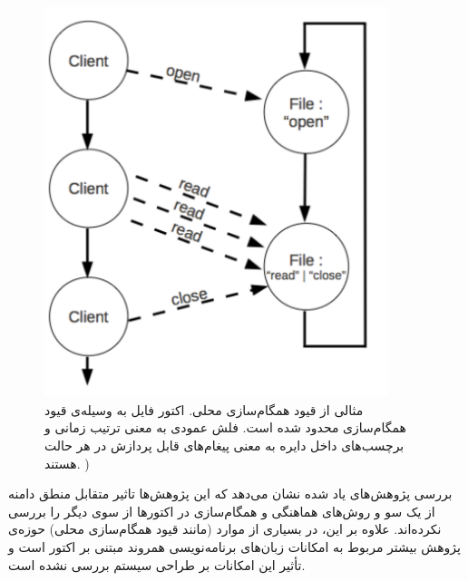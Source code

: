 \begin{figure}
    \begin{center}
	\includegraphics[width=10cm]{3-RelatedWork/Figures/LSC.pdf}
    \end{center}
    \caption{\label{fig:lsc} مثالی از قیود همگام‌سازی محلی. اکتور فایل به وسیله‌ی قیود همگام‌سازی محدود شده است. فلش عمودی به معنی ترتیب زمانی و برچسب‌های داخل دایره به معنی پیغام‌های قابل پردازش در هر حالت هستند. ) }
\end{figure}
 بررسی پژوهش‌های یاد شده نشان می‌دهد که این پژوهش‌ها تاثیر متقابل منطق دامنه از یک سو و روش‌های هماهنگی و همگام‌سازی در اکتورها از سوی دیگر را بررسی نکرده‌اند. علاوه بر این، در بسیاری از موارد (مانند قیود همگام‌سازی محلی) حوزه‌ی پژوهش بیشتر مربوط به امکانات زبان‌های برنامه‌نویسی همروند مبتنی بر اکتور است و تأثیر این امکانات بر طراحی سیستم بررسی نشده است.
 
